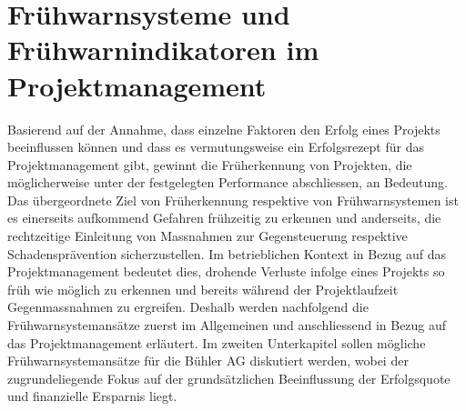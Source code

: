 \section{Frühwarnsysteme und Frühwarnindikatoren im Projektmanagement}
Basierend auf der Annahme, dass einzelne Faktoren den Erfolg eines Projekts beeinflussen können und dass es vermutungsweise ein Erfolgsrezept für das Projektmanagement gibt, gewinnt die Früherkennung von Projekten, die möglicherweise unter der festgelegten Performance abschliessen, an Bedeutung. Das übergeordnete Ziel von Früherkennung respektive von Frühwarnsystemen ist es einerseits aufkommend Gefahren frühzeitig zu erkennen und anderseits, die rechtzeitige Einleitung von Massnahmen zur Gegensteuerung respektive Schadensprävention sicherzustellen. Im betrieblichen Kontext in Bezug auf das Projektmanagement bedeutet dies, drohende Verluste infolge eines Projekts so früh wie möglich zu erkennen und bereits während der Projektlaufzeit Gegenmassnahmen zu ergreifen.  Deshalb werden nachfolgend die Frühwarnsystemansätze zuerst im Allgemeinen und anschliessend in Bezug auf das Projektmanagement erläutert. Im zweiten Unterkapitel sollen mögliche Frühwarnsystemansätze für die Bühler AG diskutiert werden, wobei der zugrundeliegende Fokus auf der grundsätzlichen Beeinflussung der Erfolgsquote und finanzielle Ersparnis liegt.
